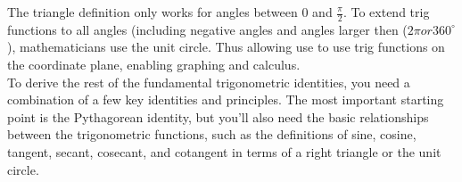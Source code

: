 \documentclass{article}
\begin{document}
The triangle definition only works for angles between 0 and $\frac{\pi}{2}$. To extend trig functions to all angles (including negative angles and angles larger then ($2\pi or 360^{\circ}$), mathematicians use the unit circle. Thus allowing use to use trig functions on the coordinate plane, enabling graphing and calculus.\\

To derive the rest of the fundamental trigonometric identities, you need a combination of a few key identities and principles. The most important starting point is the Pythagorean identity, but you’ll also need the basic relationships between the trigonometric functions, such as the definitions of sine, cosine, tangent, secant, cosecant, and cotangent in terms of a right triangle or the unit circle. \\
\end{document}
